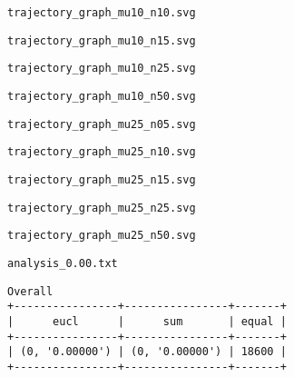 \documentclass{article}
\begin{document}
\begin{figure}[t]
\centering

\vskip-8pt
\end{figure}
\newpage
\verb|trajectory_graph_mu10_n10.svg|
\begin{figure}[t]
\centering

\vskip-8pt
\end{figure}
\newpage
\verb|trajectory_graph_mu10_n15.svg|
\begin{figure}[t]
\centering

\vskip-8pt
\end{figure}
\newpage
\verb|trajectory_graph_mu10_n25.svg|
\begin{figure}[t]
\centering

\vskip-8pt
\end{figure}
\newpage
\verb|trajectory_graph_mu10_n50.svg|
\begin{figure}[t]
\centering

\vskip-8pt
\end{figure}
\newpage
\verb|trajectory_graph_mu25_n05.svg|
\begin{figure}[t]
\centering

\vskip-8pt
\end{figure}
\newpage
\verb|trajectory_graph_mu25_n10.svg|
\begin{figure}[t]
\centering

\vskip-8pt
\end{figure}
\newpage
\verb|trajectory_graph_mu25_n15.svg|
\begin{figure}[t]
\centering

\vskip-8pt
\end{figure}
\newpage
\verb|trajectory_graph_mu25_n25.svg|
\begin{figure}[t]
\centering

\vskip-8pt
\end{figure}
\newpage
\verb|trajectory_graph_mu25_n50.svg|
\begin{figure}[t]
\centering

\vskip-8pt
\end{figure}
\newpage
\verb|analysis_0.00.txt|
\begin{verbatim}
Overall
+----------------+----------------+-------+
|      eucl      |      sum       | equal |
+----------------+----------------+-------+
| (0, '0.00000') | (0, '0.00000') | 18600 |
+----------------+----------------+-------+
\end{verbatim}
\end{document}
